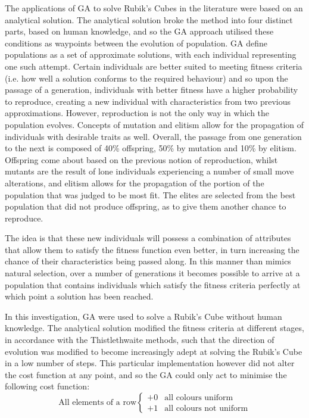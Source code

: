\documentclass[UKenglish]{libraries/svproc}
\begin{document}
The applications of GA to solve Rubik's Cubes in the literature were based on an analytical solution. The analytical solution broke the method into four distinct parts, based on human knowledge, and so the GA approach utilised these conditions as waypoints between the evolution of population. GA define populations as a set of approximate solutions, with each individual representing one such attempt. Certain individuals are better suited to meeting fitness criteria (i.e. how well a solution conforms to the required behaviour) and so upon the passage of a generation, individuals with better fitness have a higher probability to reproduce, creating a new individual with characteristics from two previous approximations. However, reproduction is not the only way in which the population evolves. Concepts of mutation and elitism allow for the propagation of individuals with desirable traits as well. Overall, the passage from one generation to the next is composed of 40\% offspring, 50\% by mutation and 10\% by elitism. Offspring come about based on the previous notion of reproduction, whilst mutants are the result of lone individuals experiencing a number of small move alterations, and elitism allows for the propagation of the portion of the population that was judged to be most fit. The elites are selected from the best population that did not produce offspring, as to give them another chance to reproduce. \par The idea is that these new individuals will possess a combination of attributes that allow them to satisfy the fitness function even better, in turn increasing the chance of their characteristics being passed along. In this manner than mimics natural selection, over a number of generations it becomes possible to arrive at a population that contains individuals which satisfy the fitness criteria perfectly at which point a solution has been reached. \par In this investigation, GA were used to solve a Rubik's Cube without human knowledge. The analytical solution modified the fitness criteria at different stages, in accordance with the Thistlethwaite methods, such that the direction of evolution was modified to become increasingly adept at solving the Rubik's Cube in a low number of steps.  This particular implementation however did not alter the cost function at any point, and so the GA could only act to minimise the following cost function:
\[
    \text{All elements of a row} 
    \begin{cases} 
      +0 & \text{all colours uniform} \\
      +1 & \text{all colours not uniform}
   \end{cases}
\]
\end{document}
